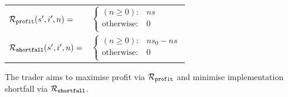 \begin{itemize}
{        \abovedisplayskip=10pt
        \belowdisplayskip=0pt
        \renewcommand{\arraystretch}{1.5}
        \begin{tabular}{ll}    
            $ \mathcal{R}_{\mathtt{profit}}(s', i', n) = $ &  
            \qquad $ \begin{cases}
            (n \geq 0) : & ns \\
            \text{otherwise} : & 0 \\
            \end{cases} $ \\
            $ \mathcal{R}_{\mathtt{shortfall}}(s', i', n) = $ &  
            \qquad $ \begin{cases}
            (n \geq 0) : & ns_0 - ns \\
            \text{otherwise} : & 0 \\
            \end{cases} $ \\
        \end{tabular}
    }    
\end{itemize}

The trader aims to maximise profit via {\footnotesize $ \mathcal{R}_{\mathtt{profit}} $} and minimise implementation shortfall via {\footnotesize $ \mathcal{R}_{\mathtt{shortfall}} $}.

